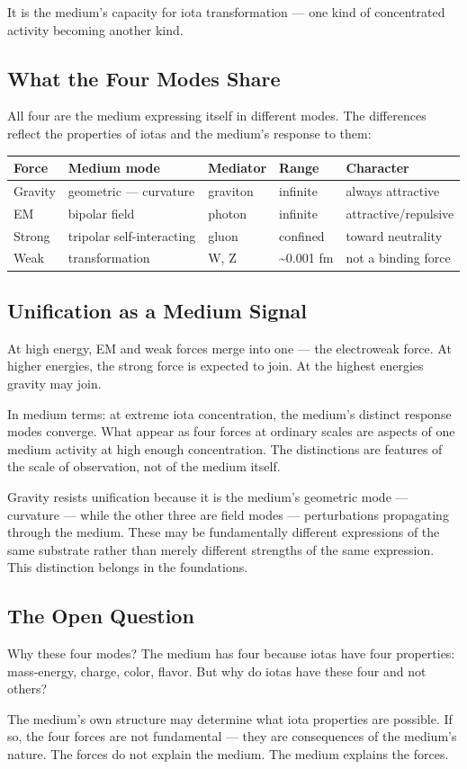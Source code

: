 \documentclass[11pt]{article}
\begin{document}
It is the medium's capacity for iota transformation — one kind of concentrated
activity becoming another kind.

\subsection{What the Four Modes Share}
\label{sec:orgca512f0}

All four are the medium expressing itself in different modes. The differences
reflect the properties of iotas and the medium's response to them:

\begin{center}
\begin{tabular}{lllll}
Force & Medium mode & Mediator & Range & Character\\[0pt]
\hline
Gravity & geometric — curvature & graviton & infinite & always attractive\\[0pt]
EM & bipolar field & photon & infinite & attractive/repulsive\\[0pt]
Strong & tripolar self-interacting & gluon & confined & toward neutrality\\[0pt]
Weak & transformation & W, Z & \textasciitilde{}0.001 fm & not a binding force\\[0pt]
\end{tabular}
\end{center}

\subsection{Unification as a Medium Signal}
\label{sec:org9782a9d}

At high energy, EM and weak forces merge into one — the electroweak force. At
higher energies, the strong force is expected to join. At the highest energies
gravity may join.

In medium terms: at extreme iota concentration, the medium's distinct response
modes converge. What appear as four forces at ordinary scales are aspects of one
medium activity at high enough concentration. The distinctions are features of
the scale of observation, not of the medium itself.

Gravity resists unification because it is the medium's geometric mode —
curvature — while the other three are field modes — perturbations propagating
through the medium. These may be fundamentally different expressions of the same
substrate rather than merely different strengths of the same expression. This
distinction belongs in the foundations.

\subsection{The Open Question}
\label{sec:org30dd684}

Why these four modes? The medium has four because iotas have four properties:
mass-energy, charge, color, flavor. But why do iotas have these four and not
others?

The medium's own structure may determine what iota properties are possible. If
so, the four forces are not fundamental — they are consequences of the medium's
nature. The forces do not explain the medium. The medium explains the forces.
\end{document}
